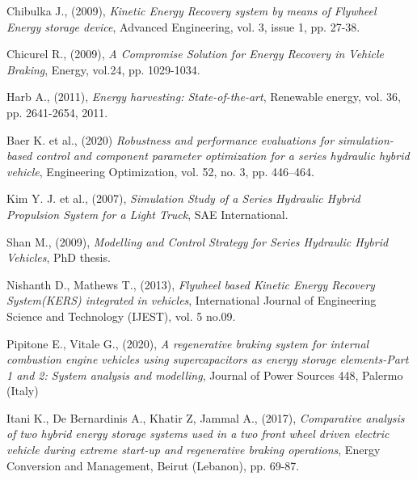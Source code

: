 \documentclass[11pt]{article}
\begin{document}
\begin{thebibliography}{60}
	
	
	
	
	
	Chibulka J., (2009), \textit{Kinetic Energy Recovery system by means of Flywheel Energy 		    storage device}, Advanced Engineering, vol. 3, issue 1, pp. 27-38.
	
	Chicurel R., (2009),  \textit{A Compromise Solution for Energy Recovery in Vehicle Braking}, Energy, vol.24, pp. 1029-1034.
	
	Harb A., (2011), \textit{Energy harvesting: State-of-the-art}, 
	Renewable energy, vol. 36, pp. 2641-2654, 2011.
	
	Baer K. et al., (2020) \textit{Robustness and performance evaluations for simulation-based 		control and component parameter optimization for a series hydraulic hybrid vehicle}, Engineering Optimization, vol. 52, no. 3, pp. 446–464.	
	
	Kim Y. J. et al., (2007), \textit{Simulation Study of a Series Hydraulic Hybrid Propulsion 					System for a Light Truck}, SAE International.
	
	Shan M., (2009), \textit{Modelling and Control Strategy for Series Hydraulic Hybrid 				Vehicles}, PhD thesis.
	
	Nishanth D., Mathews T., (2013), \textit{Flywheel based Kinetic Energy Recovery System(KERS) 	    integrated in vehicles}, International Journal of Engineering Science and Technology (IJEST), vol. 5 no.09.
	
	Pipitone E., Vitale G., (2020), \textit{A regenerative braking system for 			internal combustion engine vehicles using supercapacitors as energy storage 		elements-Part 1 and 2: System analysis and modelling}, Journal of Power 			Sources 448, Palermo (Italy)     	
	
	Itani K., De Bernardinis A., Khatir Z, Jammal A., (2017),  							\textit{Comparative analysis of two hybrid energy storage systems used in a 		two front wheel driven electric vehicle during extreme start-up and 				regenerative braking operations},  Energy Conversion and Management, Beirut 		(Lebanon), pp. 69-87.
	

\end{thebibliography}
\end{document}
